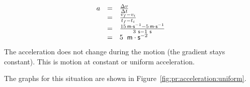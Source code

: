     \begin{equation}
    \begin{array}{ccc}\hfill a& =& \frac{\Delta v}{\Delta t}\hfill \\ & =& \frac{{v}_{f}-{v}_{i}}{{t}_{f}-{t}_{i}}\hfill \\ & =& \frac{15\phantom{\rule{0.166667em}{0ex}}\mathsf{m}\ensuremath{\cdot}{\mathsf{s}}^{-1}-5\phantom{\rule{0.166667em}{0ex}}\mathsf{m}\ensuremath{\cdot}{\mathsf{s}}^{-1}}{3\phantom{\rule{3.33333pt}{0ex}}\mathsf{s}-1\phantom{\rule{3.33333pt}{0ex}}\mathsf{s}}\hfill \\ & =& 5\phantom{\rule{4pt}{0ex}}\phantom{\rule{0.166667em}{0ex}}\mathsf{m}\ensuremath{\cdot}{\mathsf{s}}^{-2}\hfill \end{array}
      \end{equation}
        \label{m38795*id72716}The acceleration does not change during the motion (the gradient stays constant). This is motion at constant or uniform acceleration.\par 
        \label{m38795*id72723}The graphs for this situation are shown in Figure~\ref{fig:pr:acceleration:uniform}.\par 
    \setcounter{subfigure}{0}
